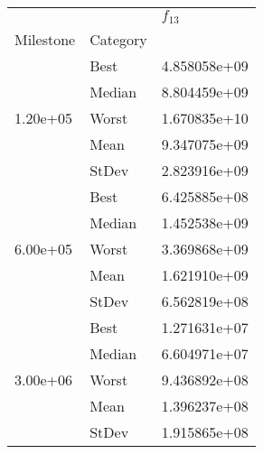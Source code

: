 \begin{tabular}{lll}
\toprule
         &      &     $f_{13}$ \\
Milestone & Category &              \\
\midrule
\multirow{5}{*}{1.20e+05} & Best & 4.858058e+09 \\
         & Median & 8.804459e+09 \\
         & Worst & 1.670835e+10 \\
         & Mean & 9.347075e+09 \\
         & StDev & 2.823916e+09 \\
\cline{1-3}
\multirow{5}{*}{6.00e+05} & Best & 6.425885e+08 \\
         & Median & 1.452538e+09 \\
         & Worst & 3.369868e+09 \\
         & Mean & 1.621910e+09 \\
         & StDev & 6.562819e+08 \\
\cline{1-3}
\multirow{5}{*}{3.00e+06} & Best & 1.271631e+07 \\
         & Median & 6.604971e+07 \\
         & Worst & 9.436892e+08 \\
         & Mean & 1.396237e+08 \\
         & StDev & 1.915865e+08 \\
\bottomrule
\end{tabular}
